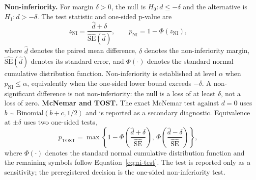 \documentclass[a4paper,fleqn]{cas-sc}
\begin{document}
\textbf{Non-inferiority.} For margin $\delta>0$, the null is $H_{0}:d\le-\delta$ and the alternative is $H_{1}:d>-\delta$. The test statistic and one-sided p-value are
\begin{equation}\label{eq:ni-test}
  z_{\mathrm{NI}}=\frac{\hat d+\delta}{\widehat{\mathrm{SE}}(\hat d)},
  \qquad
  p_{\mathrm{NI}}=1-\Phi(z_{\mathrm{NI}}),
\end{equation}
where $\hat d$ denotes the paired mean difference, $\delta$ denotes the non-inferiority margin, $\widehat{\mathrm{SE}}(\hat d)$ denotes its standard error, and $\Phi(\cdot)$ denotes the standard normal cumulative distribution function. Non-inferiority is established at level $\alpha$ when $p_{\mathrm{NI}}\le\alpha$, equivalently when the one-sided lower bound exceeds $-\delta$. A non-significant difference is not non-inferiority: the null is a loss of at least $\delta$, not a loss of zero. \textbf{McNemar and TOST.} The exact McNemar test against $d=0$ uses $b\sim\mathrm{Binomial}(b+c,1/2)$ and is reported as a secondary diagnostic. Equivalence at $\pm\delta$ uses two one-sided tests,
\begin{equation}\label{eq:tost}
  p_{\mathrm{TOST}}=\max\left\{1-\Phi\left(\frac{\hat d+\delta}{\widehat{\mathrm{SE}}}\right),\,
  \Phi\left(\frac{\hat d-\delta}{\widehat{\mathrm{SE}}}\right)\right\},
\end{equation}
where $\Phi(\cdot)$ denotes the standard normal cumulative distribution function and the remaining symbols follow Equation~\eqref{eq:ni-test}. The test is reported only as a sensitivity; the preregistered decision is the one-sided non-inferiority test.
\end{document}
